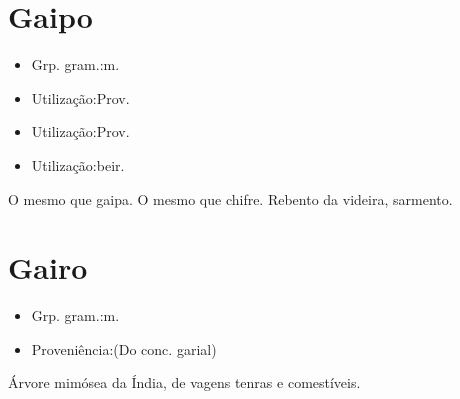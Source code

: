 \section{Gaipo}
\begin{itemize}
\item {Grp. gram.:m.}
\end{itemize}
\begin{itemize}
\item {Utilização:Prov.}
\end{itemize}
\begin{itemize}
\item {Utilização:Prov.}
\end{itemize}
\begin{itemize}
\item {Utilização:beir.}
\end{itemize}
O mesmo que \textunderscore gaipa\textunderscore .
O mesmo que \textunderscore chifre\textunderscore .
Rebento da videira, sarmento.
\section{Gairo}
\begin{itemize}
\item {Grp. gram.:m.}
\end{itemize}
\begin{itemize}
\item {Proveniência:(Do conc. \textunderscore garial\textunderscore )}
\end{itemize}
Árvore mimósea da Índia, de vagens tenras e comestíveis.

